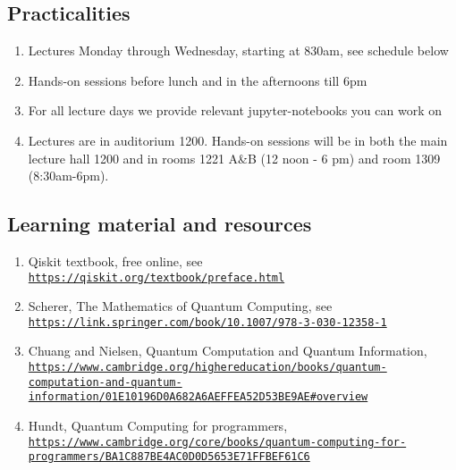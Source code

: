 \documentclass[%
oneside,                 %
final,                   %
10pt]{article}
\begin{document}
\subsection*{Practicalities}

\begin{enumerate}
\item Lectures Monday through Wednesday, starting at 830am, see schedule below

\item Hands-on sessions before lunch and in the afternoons till 6pm

\item For all lecture days we provide relevant jupyter-notebooks you can work on

\item Lectures are in auditorium 1200. Hands-on sessions will be in both the main lecture hall 1200 and in rooms 1221 A{\&}B (12 noon - 6 pm) and room 1309 (8:30am-6pm).
\end{enumerate}

\noindent
\subsection*{Learning material and resources}
\begin{enumerate}
\item Qiskit textbook, free online, see \href{{https://qiskit.org/textbook/preface.html}}{\nolinkurl{https://qiskit.org/textbook/preface.html}}

\item Scherer, The Mathematics of Quantum Computing, see \href{{https://link.springer.com/book/10.1007/978-3-030-12358-1}}{\nolinkurl{https://link.springer.com/book/10.1007/978-3-030-12358-1}}

\item Chuang and Nielsen, Quantum Computation and Quantum Information, \href{{https://www.cambridge.org/highereducation/books/quantum-computation-and-quantum-information/01E10196D0A682A6AEFFEA52D53BE9AE#overview}}{\nolinkurl{https://www.cambridge.org/highereducation/books/quantum-computation-and-quantum-information/01E10196D0A682A6AEFFEA52D53BE9AE\#overview}}

\item Hundt, Quantum Computing for programmers, \href{{https://www.cambridge.org/core/books/quantum-computing-for-programmers/BA1C887BE4AC0D0D5653E71FFBEF61C6}}{\nolinkurl{https://www.cambridge.org/core/books/quantum-computing-for-programmers/BA1C887BE4AC0D0D5653E71FFBEF61C6}}
\end{enumerate}
\end{document}
